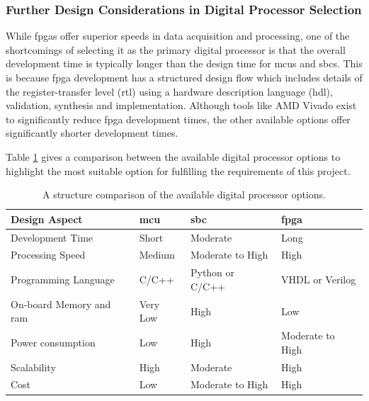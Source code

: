 \documentclass[class=report,11pt,crop=false]{standalone}
\begin{document}
	\subsubsection{Further Design Considerations in Digital Processor Selection}
	
	While \acrshort{fpga}s offer superior speeds in data acquisition and processing, one of the shortcomings of selecting it as the primary digital processor is that the overall development time is typically longer than the design time for \acrshort{mcu}s and \acrshort{sbc}s. This is because \acrshort{fpga} development has a structured design flow which includes details of the register-transfer level (\acrshort{rtl}) using a hardware description language (\acrshort{hdl}), validation, synthesis and implementation. Although tools like AMD Vivado exist to significantly reduce \acrshort{fpga} development times, the other available options offer significantly shorter development times. 
	
	Table \ref{tab:digital-processor-comparison} gives a comparison between the available digital processor options to highlight the most suitable option for fulfilling the requirements of this project. 
	
	\begin{table}[ht!]
		\centering
		\label{tab:digital-processor-comparison}
		\begin{tabular}{|m{8em}|m{10em}|m{10em}|m{10em}|}
			\hline
			\cellcolor{cyan!25}\textbf{Design Aspect}	&	\cellcolor{cyan!25}\textbf{\acrshort{mcu}}	&	\cellcolor{cyan!25}\textbf{\acrshort{sbc}}	&	\cellcolor{cyan!25}\textbf{\acrshort{fpga}}\\
			\hline
			Development Time	&	Short	&	Moderate	& 	Long\\
			\hline
			Processing Speed	& 	Medium	&	Moderate to High	& 	High\\
			\hline
			Programming Language	& C/C++ &	Python or C/C++	 & VHDL or Verilog\\
			\hline
			On-board Memory and \acrshort{ram}	& Very Low & High	& Low\\
			\hline
			Power consumption	& Low	& High	& Moderate to High\\
			\hline
			Scalability		& High	& Moderate	& High \\
			\hline
			Cost	& Low	& Moderate to High	& High\\
			\hline	
		\end{tabular}
		\caption{A structure comparison of the available digital processor options.}
	\end{table}
\end{document}
